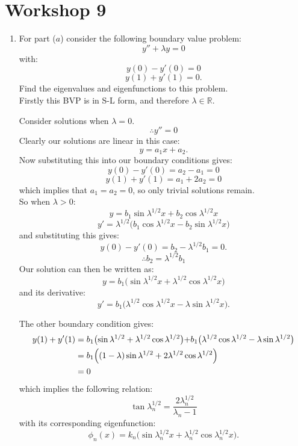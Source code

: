 \pagestyle{fancy}
\fancyhead{}

\section{Workshop 9}
\begin{enumerate}
    \item For part ($a$) consider the following boundary value problem:
    $$y''+\lambda y=0$$
    with:
    $$y(0)-y'(0)=0$$
    $$y(1)+y'(1)=0.$$
    Find the eigenvalues and eigenfunctions to this problem. \\

    Firstly this BVP is in S-L form, and therefore
    $\lambda\in\mathbb{R}$.

    Consider solutions when $\lambda=0$.
    $$\therefore y''=0$$
    Clearly our solutions are linear in this case:
    $$y=a_1 x+a_2.$$
    Now substituting this into our boundary conditions gives:
    $$y(0)-y'(0)=a_2-a_1=0$$
    $$y(1)+y'(1)=a_1+2a_2=0$$
    which implies that $a_1=a_2=0$, so only trivial solutions remain. \\

    So when $\lambda>0$:
    $$y=b_1\sin\lambda^{1/2}x+b_2\cos\lambda^{1/2}x$$
    $$y'=\lambda^{1/2}\bigl(b_1\cos\lambda^{1/2}x-b_2\sin\lambda^{1/2}x\bigl)$$
    and substituting this gives:
    $$y(0)-y'(0)=b_2-\lambda^{1/2}b_1=0.$$
    $$\therefore b_2=\lambda^{1/2}b_1$$
    Our solution can then be written as:
    $$y=b_1\bigl(\sin\lambda^{1/2}x+\lambda^{1/2}\cos\lambda^{1/2}x\bigl)$$
    and its derivative:
    $$y'=b_1\bigl(\lambda^{1/2}\cos\lambda^{1/2}x-\lambda\sin\lambda^{1/2}x\bigl).$$

    \newpage

    The other boundary condition gives:
    \begin{align*}
        y(1)+y'(1)
        &=b_1\bigl(\sin\lambda^{1/2}+\lambda^{1/2}\cos\lambda^{1/2}\bigl)
        +b_1\bigl(\lambda^{1/2}\cos\lambda^{1/2}-\lambda\sin\lambda^{1/2}\bigr) \\
        &=b_1\Bigl((1-\lambda)\sin\lambda^{1/2}+2\lambda^{1/2}\cos\lambda^{1/2}\Bigr) \\
        &=0
    \end{align*}
    which implies the following relation:
    $$\tan\lambda_n^{1/2}=\frac{2\lambda_n^{1/2}}{\lambda_n-1}$$
    with its corresponding eigenfunction:
    $$\phi_n(x)=k_n\bigl(\sin\lambda_n^{1/2}x+\lambda_n^{1/2}\cos\lambda_n^{1/2}x\bigr).$$ \\


\end{enumerate}
